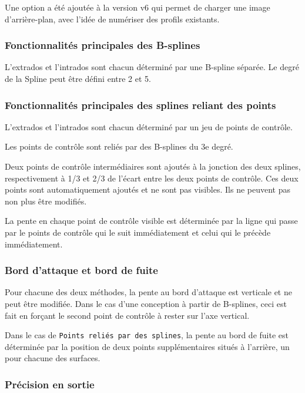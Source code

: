 \documentclass[a4paper,twoside,12pt,dvips]{article}
\begin{document}
Une option a été ajoutée à la version v6 qui permet de charger une image
d’arrière-plan, avec l’idée de numériser des profils existants.

\subsubsection{Fonctionnalités principales des B-splines}

L’extrados et l’intrados sont chacun déterminé par une B-spline séparée. 
Le degré de la Spline peut être défini entre 2 et 5.

\subsubsection{Fonctionnalités principales des splines reliant des points}

L’extrados et l’intrados sont chacun déterminé par un jeu de points de 
contrôle.

Les points de contrôle sont reliés par des B-splines du 3e degré.

Deux points de contrôle intermédiaires sont ajoutés à la jonction des deux
splines, respectivement à 1/3 et 2/3 de l’écart entre les deux points de
contrôle. Ces deux points sont automatiquement ajoutés et ne sont pas
visibles. Ils ne peuvent pas non plus être modifiés.

La pente en chaque point de contrôle visible est déterminée par la ligne qui passe par le points de contrôle qui le suit immédiatement et celui qui le précède immédiatement.

\subsubsection{Bord d’attaque et bord de fuite}

Pour chacune des deux méthodes, la pente au bord d’attaque est verticale et ne peut être modifiée. Dans le cas d’une conception à partir de B-splines, ceci est fait en forçant le second point de contrôle à rester sur l’axe vertical.

Dans le cas de \texttt{Points reliés par des splines}, la pente au bord de fuite
est déterminée par la position de deux points supplémentaires situés à l’arrière, un pour chacune des surfaces. 

\subsubsection{Précision en sortie}
\end{document}
